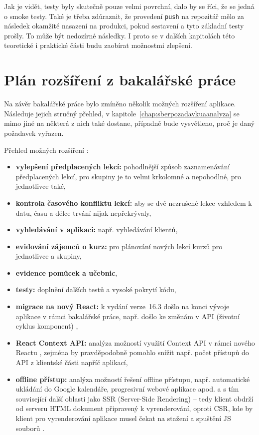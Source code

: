 Jak je vidět, testy byly skutečně pouze velmi povrchní, dalo by se říci, že se jedná o smoke testy. Také je třeba zdůraznit, že provedení \verb|push| na repozitář mělo za následek okamžité nasazení na produkci, pokud sestavení a tyto základní testy prošly. To může být nedozírné následky. I proto se v dalších kapitolách této teoretické i praktické části budu zaobírat možnostmi zlepšení.

\section{Plán rozšíření z bakalářské práce}\label{sec:planrozsirenibp}

Na závěr bakalářské práce \cite{bp} bylo zmíněno několik možných rozšíření aplikace. Následuje jejich stručný přehled, v kapitole~\ref{chap:sberpozadavkuaanalyza} se mimo jiné na některá z nich také dostane, případně bude vysvětleno, proč je daný požadavek vyřazen.

Přehled možných rozšíření \cite{bp}:
\begin{itemize}
    \item \textbf{vylepšení předplacených lekcí:} pohodlnější způsob zaznamenávání předplacených lekcí, pro skupiny je to velmi krkolomné a nepohodlné, pro jednotlivce také,
    \item \textbf{kontrola časového konfliktu lekcí:} aby se dvě nezrušené lekce vzhledem k datu, času a délce trvání nijak nepřekrývaly,
    \item \textbf{vyhledávání v aplikaci:} např. vyhledávání klientů,
    \item \textbf{evidování zájemců o kurz:} pro plánování nových lekcí kurzů pro jednotlivce a skupiny,
    \item \textbf{evidence pomůcek a učebnic},
    \item \textbf{testy:} doplnění dalších testů a vysoké pokrytí kódu,
    \item \textbf{migrace na nový React:} k vydání verze~16.3 došlo na konci vývoje aplikace v rámci bakalářské práce, např. došlo ke změnám v API (životní cyklus komponent) \cite{react-blog-163},
    \item \textbf{React Context API:} analýza možností využití Context API v rámci nového Reactu \cite{react-blog-163}, zejména by pravděpodobně pomohlo snížit např. počet přístupů do API z klientské části napříč aplikací,
    \item \textbf{offline přístup:} analýza možností řešení offline přístupu, např. automatické ukládání do Google kalendáře, progresivní webové aplikace apod. a s tím související další oblasti jako SSR (Server-Side Rendering) -- tedy klient obdrží od serveru HTML dokument připravený k vyrenderování, oproti CSR, kde by klient pro vyrenderování aplikace musel čekat na stažení a spuštění JS souborů \cite{csr-ssr}.
\end{itemize}

